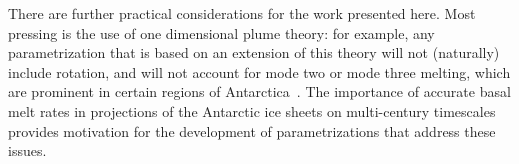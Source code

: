 \documentclass[openacc]{rsproca_new}%
\begin{document}
There are further practical considerations for the work presented here. Most pressing is the use of one dimensional plume theory: for example, any parametrization that is based on an extension of this theory will not (naturally) include rotation, and will not account for mode two or mode three melting, which are prominent in certain regions of Antarctica~\cite{Adusumilli2020NatureGeo}. The importance of accurate basal melt rates in projections of the Antarctic ice sheets on multi-century timescales provides motivation for the development of parametrizations that address these issues. 

\enlargethispage{20pt}









%



\end{document}
